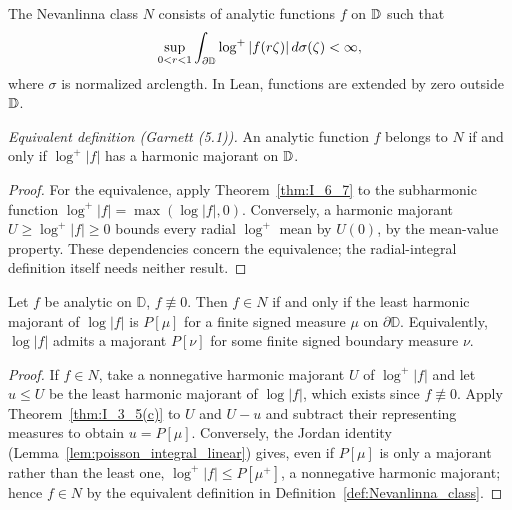 \begin{definition}
  \label{def:Nevanlinna_class}
  \leanok
  The Nevanlinna class $N$ consists of analytic functions $f$ on $\mathbb{D}$ such that
  \[
    \sup_{0<r<1}\int_{\partial\mathbb{D}}\log^+|f(r\zeta)|\,d\sigma(\zeta)<\infty,
  \]
  where $\sigma$ is normalized arclength. In Lean, functions are extended by
  zero outside $\mathbb{D}$.

  \emph{Equivalent definition (Garnett (5.1)).} An analytic function $f$ belongs
  to $N$ if and only if $\log^+|f|$ has a harmonic majorant on $\mathbb{D}$.
  \begin{proof}
    \leanok
    For the equivalence, apply Theorem~\ref{thm:I_6_7} to the subharmonic
    function $\log^+|f|=\max(\log|f|,0)$. Conversely, a harmonic majorant
    $U\ge\log^+|f|\ge0$ bounds every radial $\log^+$ mean by $U(0)$, by the
    mean-value property. These dependencies concern the equivalence; the
    radial-integral definition itself needs neither result.
  \end{proof}
\end{definition}

\begin{theorem}
  \label{thm:II_5_1}
  \leanok
  \mainline
  Let $f$ be analytic on $\mathbb{D}$, $f\not\equiv0$. Then $f\in N$ if and
  only if the least harmonic majorant of $\log|f|$ is $P[\mu]$ for a finite
  signed measure $\mu$ on $\partial\mathbb{D}$. Equivalently, $\log|f|$
  admits a majorant $P[\nu]$ for some finite signed boundary measure $\nu$.
  \begin{proof}
    \leanok
    If $f\in N$, take a nonnegative harmonic majorant $U$ of $\log^+|f|$
    and let $u\le U$ be the least harmonic majorant of $\log|f|$, which
    exists since $f\not\equiv0$. Apply Theorem~\ref{thm:I_3_5(c)} to $U$ and
    $U-u$ and subtract their representing measures to obtain $u=P[\mu]$.
    Conversely, the Jordan identity
    (Lemma~\ref{lem:poisson_integral_linear}) gives, even if $P[\mu]$
    is only a majorant rather than the least one,
    $\log^+|f|\le P[\mu^+]$, a nonnegative harmonic majorant; hence $f\in N$
    by the equivalent definition in Definition~\ref{def:Nevanlinna_class}.
  \end{proof}
\end{theorem}

